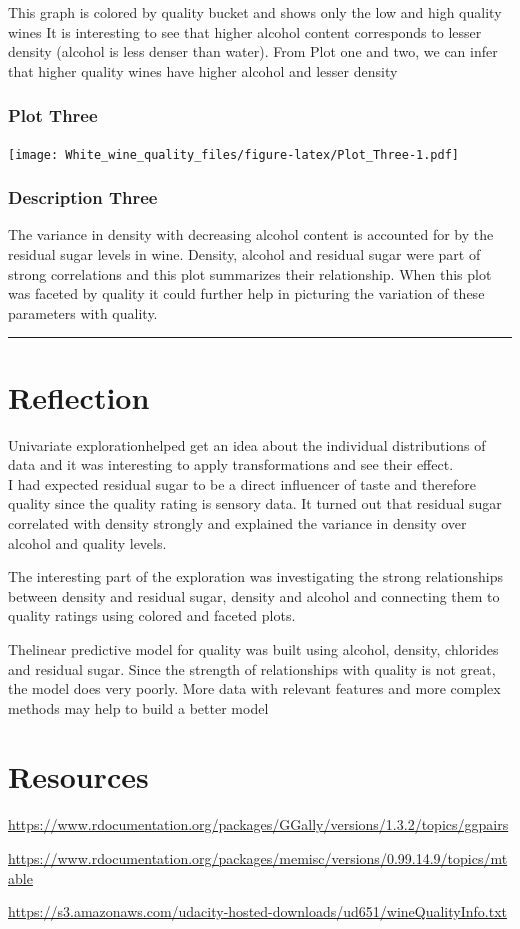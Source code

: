 \documentclass[]{article}
\begin{document}
This graph is colored by quality bucket and shows only the low and high
quality wines It is interesting to see that higher alcohol content
corresponds to lesser density (alcohol is less denser than water). From
Plot one and two, we can infer that higher quality wines have higher
alcohol and lesser density

\subsubsection{Plot Three}\label{plot-three}

\texttt{[image: White\_wine\_quality\_files/figure-latex/Plot\_Three-1.pdf]}

\subsubsection{Description Three}\label{description-three}

The variance in density with decreasing alcohol content is accounted for
by the residual sugar levels in wine. Density, alcohol and residual
sugar were part of strong correlations and this plot summarizes their
relationship. When this plot was faceted by quality it could further
help in picturing the variation of these parameters with quality.

\begin{center}\rule{0.5\linewidth}{\linethickness}\end{center}

\section{Reflection}\label{reflection}

Univariate explorationhelped get an idea about the individual
distributions of data and it was interesting to apply transformations
and see their effect.\\
I had expected residual sugar to be a direct influencer of taste and
therefore quality since the quality rating is sensory data. It turned
out that residual sugar correlated with density strongly and explained
the variance in density over alcohol and quality levels.

The interesting part of the exploration was investigating the strong
relationships between density and residual sugar, density and alcohol
and connecting them to quality ratings using colored and faceted plots.

Thelinear predictive model for quality was built using alcohol, density,
chlorides and residual sugar. Since the strength of relationships with
quality is not great, the model does very poorly. More data with
relevant features and more complex methods may help to build a better
model

\section{Resources}\label{resources}

\url{https://www.rdocumentation.org/packages/GGally/versions/1.3.2/topics/ggpairs}

\url{https://www.rdocumentation.org/packages/memisc/versions/0.99.14.9/topics/mtable}

\url{https://s3.amazonaws.com/udacity-hosted-downloads/ud651/wineQualityInfo.txt}
\end{document}
